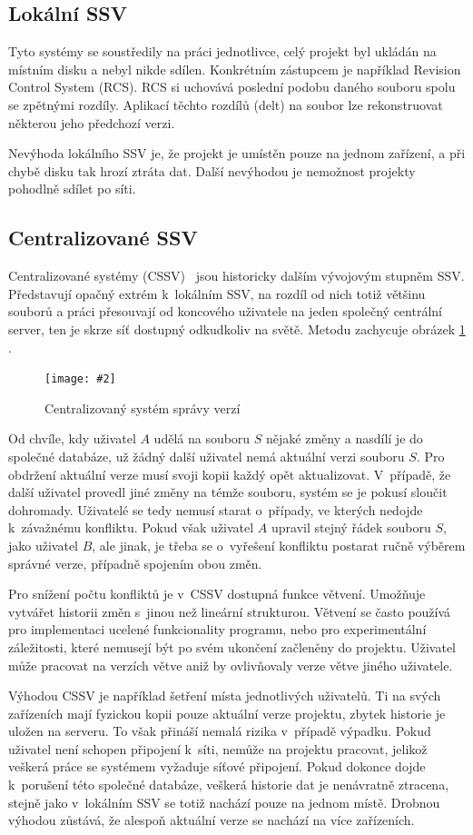 \documentclass[
  biblatex,
  glossaries,
  index
]{kidiplom}
\newcommand{\pic}[4]{
\begin{figure}[h]
\centering
\texttt{[image: \#2]}
\caption{#3}
\label{fig:#4}
\end{figure}}
\begin{document}
\subsection{Lokální SSV}
Tyto systémy se soustředily na práci jednotlivce, celý projekt byl 
ukládán na místním disku a nebyl nikde sdílen. Konkrétním zástupcem je 
například Revision Control System (RCS). RCS si uchovává poslední podobu  
daného souboru spolu se zpětnými rozdíly. Aplikací těchto rozdílů (delt) 
na soubor lze rekonstruovat některou jeho předchozí verzi.

Nevýhoda lokálního SSV je, že projekt je umístěn pouze na jednom 
zařízení, a při chybě disku tak hrozí ztráta dat. Další nevýhodou je 
nemožnost projekty pohodlně sdílet po síti.

\subsection{Centralizované SSV}
Centralizované systémy (CSSV)~\cite{otte} jsou historicky dalším vývojovým stupněm SSV. 
Představují opačný extrém k~lokálním SSV, na rozdíl od nich totiž 
většinu souborů a práci přesouvají od koncového uživatele na jeden 
společný centrální server, ten je skrze síť dostupný odkudkoliv na světě. Metodu zachycuje obrázek \ref{fig:centralized} \cite{gitreference}.

\pic{10cm}{centralized.png}{Centralizovaný systém správy verzí}{centralized}

Od chvíle, kdy uživatel $A$ udělá na souboru $S$ nějaké změny a nasdílí
je do společné databáze, už žádný další uživatel nemá aktuální
verzi souboru $S$.
Pro obdržení aktuální verze musí svoji kopii každý opět aktualizovat.
V~případě, že další uživatel provedl jiné změny na témže souboru,
systém se je pokusí sloučit dohromady. Uživatelé se tedy nemusí starat
o~případy, ve kterých nedojde k~závažnému konfliktu. Pokud však uživatel $A$ 
upravil stejný řádek souboru $S$, jako uživatel $B$, ale jinak, je třeba se 
o~vyřešení konfliktu postarat ručně výběrem správné verze, případně
spojením obou změn.

Pro snížení počtu konfliktů je v~CSSV dostupná funkce větvení. Umožňuje 
vytvářet historii změn s~jinou než lineární strukturou. Větvení se často
používá pro implementaci ucelené funkcionality programu, nebo pro 
experimentální záležitosti, které nemusejí být po svém ukončení začleněny 
do projektu. Uživatel může pracovat na verzích větve aniž by ovlivňovaly
verze větve jiného uživatele.

Výhodou CSSV je například
šetření místa jednotlivých uživatelů. Ti na svých zařízeních mají fyzickou 
kopii pouze aktuální verze projektu, zbytek historie je uložen na serveru.
To však přináší nemalá rizika v~případě výpadku. Pokud uživatel není
schopen připojení k~síti, nemůže na projektu pracovat, jelikož veškerá
práce se systémem vyžaduje síťové připojení. Pokud dokonce dojde
k~porušení této společné databáze, veškerá historie dat je nenávratně
ztracena, stejně jako v~lokálním SSV se totiž nachází pouze na jednom místě. Drobnou výhodou 
zůstává, že alespoň aktuální verze se nachází na více zařízeních.
\end{document}
